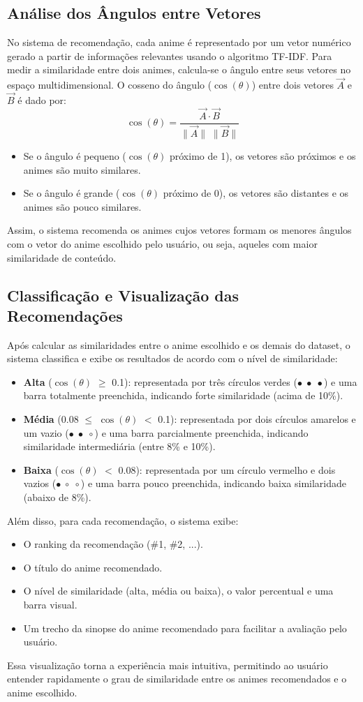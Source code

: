 \documentclass{article}
\begin{document}
\subsection*{Análise dos Ângulos entre Vetores}
No sistema de recomendação, cada anime é representado por um vetor numérico gerado a partir de informações relevantes usando o algoritmo TF-IDF. Para medir a similaridade entre dois animes, calcula-se o ângulo entre seus vetores no espaço multidimensional.
O cosseno do ângulo ($\cos(\theta)$) entre dois vetores $\vec{A}$ e $\vec{B}$ é dado por:
\[
    \cos(\theta) = \frac{\vec{A} \cdot \vec{B}}{\|\vec{A}\| \; \|\vec{B}\|}
\]
\begin{itemize}
    \item Se o ângulo é pequeno ($\cos(\theta)$ próximo de 1), os vetores são próximos e os animes são muito similares.
    \item Se o ângulo é grande ($\cos(\theta)$ próximo de 0), os vetores são distantes e os animes são pouco similares.
\end{itemize}
Assim, o sistema recomenda os animes cujos vetores formam os menores ângulos com o vetor do anime escolhido pelo usuário, ou seja, aqueles com maior similaridade de conteúdo.

\subsection*{Classificação e Visualização das Recomendações}
Após calcular as similaridades entre o anime escolhido e os demais do dataset, o sistema classifica e exibe os resultados de acordo com o nível de similaridade:
\begin{itemize}
        \item \textbf{Alta} (\texttt{$\cos(\theta)$} $\geq$ 0.1): representada por três círculos verdes ($\bullet\;\bullet\;\bullet$) e uma barra totalmente preenchida, indicando forte similaridade (acima de 10\%).
        \item \textbf{Média} (0.08 $\leq$ \texttt{$\cos(\theta)$} $<$ 0.1): representada por dois círculos amarelos e um vazio ($\bullet\;\bullet\;\circ$) e uma barra parcialmente preenchida, indicando similaridade intermediária (entre 8\% e 10\%).
        \item \textbf{Baixa} (\texttt{$\cos(\theta)$} $<$ 0.08): representada por um círculo vermelho e dois vazios ($\bullet\;\circ\;\circ$) e uma barra pouco preenchida, indicando baixa similaridade (abaixo de 8\%).
\end{itemize}
Além disso, para cada recomendação, o sistema exibe:
\begin{itemize}
    \item O ranking da recomendação (\#1, \#2, ...).
    \item O título do anime recomendado.
    \item O nível de similaridade (alta, média ou baixa), o valor percentual e uma barra visual.
    \item Um trecho da sinopse do anime recomendado para facilitar a avaliação pelo usuário.
\end{itemize}
Essa visualização torna a experiência mais intuitiva, permitindo ao usuário entender rapidamente o grau de similaridade entre os animes recomendados e o anime escolhido.
\end{document}
